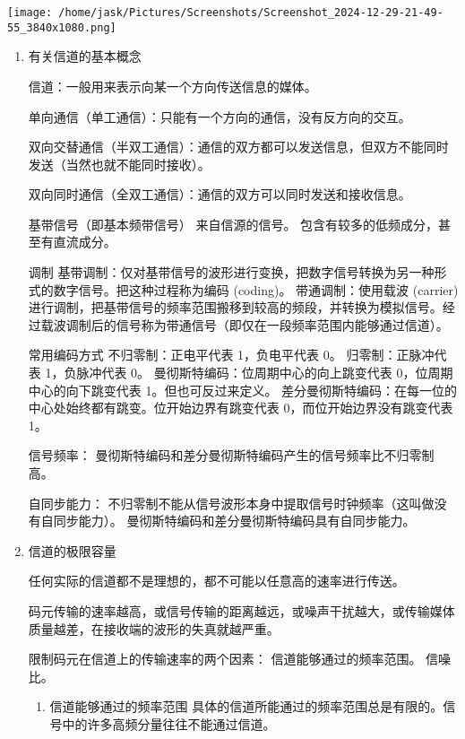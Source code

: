\documentclass[11pt]{article}
\begin{document}
\begin{center}
\texttt{[image: /home/jask/Pictures/Screenshots/Screenshot\_2024-12-29-21-49-55\_3840x1080.png]}
\end{center}
\begin{enumerate}
\item 有关信道的基本概念
\label{sec:org6f9efff}

信道：一般用来表示向某一个方向传送信息的媒体。

单向通信（单工通信）：只能有一个方向的通信，没有反方向的交互。

双向交替通信（半双工通信）：通信的双方都可以发送信息，但双方不能同时发送（当然也就不能同时接收）。

双向同时通信（全双工通信）：通信的双方可以同时发送和接收信息。

基带信号（即基本频带信号）
  来自信源的信号。
  包含有较多的低频成分，甚至有直流成分。

调制
  基带调制：仅对基带信号的波形进行变换，把数字信号转换为另一种形式的数字信号。把这种过程称为编码 (coding)。
  带通调制：使用载波 (carrier)进行调制，把基带信号的频率范围搬移到较高的频段，并转换为模拟信号。经过载波调制后的信号称为带通信号（即仅在一段频率范围内能够通过信道）。

常用编码方式
不归零制：正电平代表 1，负电平代表 0。
归零制：正脉冲代表 1，负脉冲代表 0。
曼彻斯特编码：位周期中心的向上跳变代表 0，位周期中心的向下跳变代表 1。但也可反过来定义。
差分曼彻斯特编码：在每一位的中心处始终都有跳变。位开始边界有跳变代表 0，而位开始边界没有跳变代表 1。

信号频率：
  曼彻斯特编码和差分曼彻斯特编码产生的信号频率比不归零制高。

自同步能力：
  不归零制不能从信号波形本身中提取信号时钟频率（这叫做没有自同步能力）。
  曼彻斯特编码和差分曼彻斯特编码具有自同步能力。
\item 信道的极限容量
\label{sec:orga40b483}

任何实际的信道都不是理想的，都不可能以任意高的速率进行传送。

码元传输的速率越高，或信号传输的距离越远，或噪声干扰越大，或传输媒体质量越差，在接收端的波形的失真就越严重。

限制码元在信道上的传输速率的两个因素：
  信道能够通过的频率范围。
  信噪比。

\begin{enumerate}
\item 信道能够通过的频率范围
具体的信道所能通过的频率范围总是有限的。信号中的许多高频分量往往不能通过信道。


\end{enumerate}
\end{enumerate}
\end{document}
